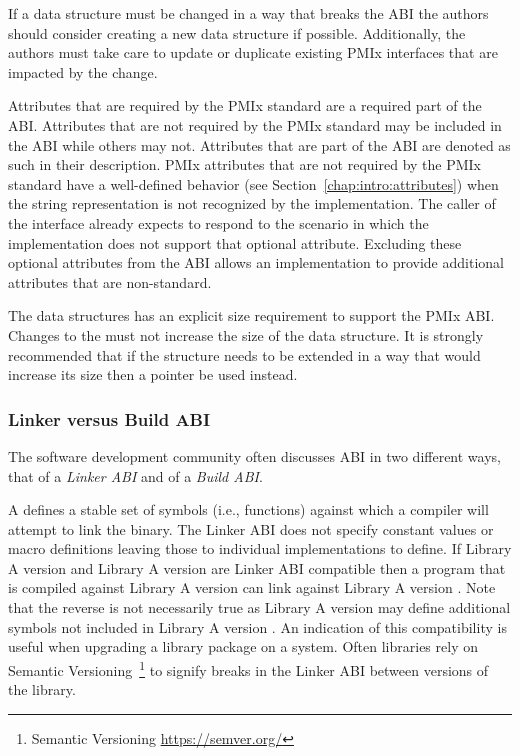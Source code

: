 If a data structure must be changed in a way that breaks the \ac{ABI} the authors should consider creating a new data structure if possible.
Additionally, the authors must take care to update or duplicate existing PMIx interfaces that are impacted by the change.

Attributes that are required by the PMIx standard are a required part of the \ac{ABI}.
Attributes that are not required by the PMIx standard may be included in the \ac{ABI} while others may not.
Attributes that are part of the \ac{ABI} are denoted as such in their description.
PMIx attributes that are not required by the PMIx standard have a well-defined behavior (see Section~\ref{chap:intro:attributes}) when the string representation is not recognized by the implementation.
The caller of the interface already expects to respond to the scenario in which the implementation does not support that optional attribute.
Excluding these optional attributes from the ABI allows an implementation to provide additional attributes that are non-standard.

The  data structures has an explicit size requirement to support the PMIx \ac{ABI}.
Changes to the  must not increase the size of the data structure.
It is strongly recommended that if the structure needs to be extended in a way that would increase its size then a pointer be used instead.

\subsubsection{Linker versus Build ABI}

The software development community often discusses \ac{ABI} in two different ways, that of a \emph{Linker ABI} and of a \emph{Build ABI}.

A  defines a stable set of symbols (i.e., functions) against which a compiler will attempt to link the binary.
The Linker ABI does not specify constant values or macro definitions leaving those to individual implementations to define.
If Library A version  and Library A version  are Linker ABI compatible then a program that is compiled against Library A version  can link against Library A version .
Note that the reverse is not necessarily true as Library A version  may define additional symbols not included in Library A version .
An indication of this compatibility is useful when upgrading a library package on a system.
Often libraries rely on Semantic Versioning~\footnote{Semantic Versioning \url{https://semver.org/}} to signify breaks in the Linker ABI between versions of the library.

